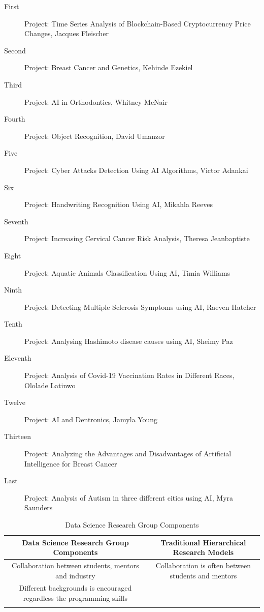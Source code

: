 \documentclass[10pt, a4paper, twocolumn]{article} %
\begin{document}
\begin{description}
	\item[First] Project: Time Series Analysis of Blockchain-Based Cryptocurrency Price Changes, Jacques Fleischer
	\item[Second] Project: Breast Cancer and Genetics, Kehinde Ezekiel
	\item[Third] Project: AI in Orthodontics, Whitney McNair
	\item[Fourth] Project: Object Recognition, David Umanzor
	\item[Five] Project: Cyber Attacks Detection Using AI Algorithms, Victor Adankai
	\item[Six]  Project: Handwriting Recognition Using AI, Mikahla Reeves
	\item[Seventh] Project: Increasing Cervical Cancer Risk Analysis, Theresa Jeanbaptiste
	\item[Eight] Project: Aquatic Animals Classification Using AI, Timia Williams
	\item[Ninth] Project: Detecting Multiple Sclerosis Symptoms using AI, Raeven Hatcher
	\item[Tenth] Project: Analysing Hashimoto disease causes using AI, Sheimy Paz
	\item[Eleventh] Project: Analysis of Covid-19 Vaccination Rates in Different Races, Ololade Latinwo
	\item[Twelve] Project: AI and Dentronics, Jamyla Young
	\item[Thirteen] Project: Analyzing the Advantages and Disadvantages of Artificial Intelligence for Breast Cancer 
	\item[Last] Project: Analysis of Autism in three different cities using AI, Myra Saunders
\end{description}

\begin{table}
\centering
\caption{Data Science Research Group Components}
\begin{tabular}{|c|c|} \hline
Data Science Research Group Components&Traditional Hierarchical Research Models\\ \hline
Collaboration between students, mentors and industry & Collaboration is often between students and mentors\\ \hline
Different backgrounds is encouraged regardless the programming skills & \\ \hline
 &  \\ \hline
\hline\end{tabular}
\end{table}
\end{document}
